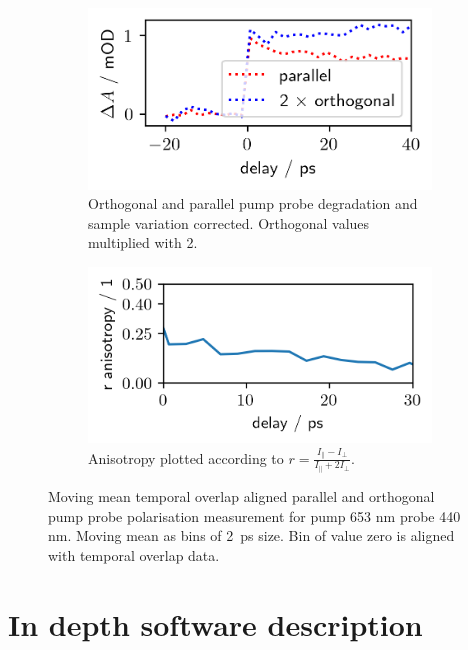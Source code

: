 \documentclass[twoside,openright]{scrreprt}
\begin{document}
{\begin{figure}[hbt]
\centering
\begin{subfigure}[t]{0.49\linewidth}
\includegraphics[scale=1]{images/440nm_ParallelOrthComparison.png}
\caption{Orthogonal and parallel pump probe degradation and sample variation corrected. Orthogonal values multiplied with 2.\label{fig:polarisationComp}}
\end{subfigure}
\hfill
\begin{subfigure}[t]{0.49\linewidth}
\includegraphics[scale=1]{images/440nm_ParallelOrthComparison_anisotropy.png}
\caption{Anisotropy plotted according to $r = \frac{I_\parallel-I_\perp}{I_\parallel + 2 I_\perp}$.}
\end{subfigure}
\caption{Moving mean temporal overlap aligned parallel and orthogonal pump probe polarisation measurement for pump 653 nm probe 440 nm. Moving mean as bins of \SI{2}{\pico\second} size. Bin of value zero is aligned with temporal overlap data.\label{fig:440nmPolarisations}}
\end{figure}




\chapter{In depth software description}
}
\end{document}
